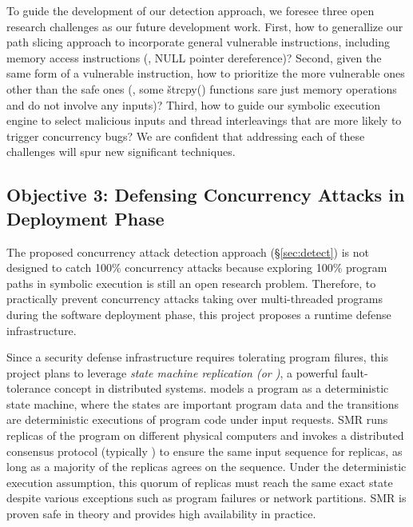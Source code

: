  To guide the development of our detection 
approach, we foresee three open research challenges as our future development 
work. First, how to generallize our path slicing approach to incorporate general 
vulnerable instructions, including memory access instructions (\eg, NULL pointer 
dereference)? Second, given the same form of a vulnerable instruction, how to 
prioritize the more vulnerable ones other than the safe ones (\eg, some 
\v{strcpy()} functions sare just memory operations and do not involve any 
inputs)? Third, how to guide our symbolic execution engine to select malicious 
inputs and thread interleavings that are more likely to trigger concurrency 
bugs? We are confident that addressing each of these challenges will spur new 
significant techniques.

\vspace{-.15in}\subsection{Objective 3: Defensing Concurrency Attacks 
in Deployment Phase}\label{sec:defense}\vspace{-.075in}

The proposed concurrency attack detection approach (\S\ref{sec:detect}) is not 
designed to catch 100\% concurrency attacks because exploring 100\% program 
paths in symbolic execution is still an open research problem. Therefore, to 
practically prevent concurrency attacks taking over multi-threaded programs 
during the software deployment phase, this project proposes a runtime defense 
infrastructure.

Since a security defense infrastructure requires tolerating program filures, 
this project plans to leverage \emph{state machine replication (or \smr)}, a 
powerful fault-tolerance concept in distributed systems. \smr 
models a program as a deterministic state machine, where the states are 
important program data and the transitions are deterministic executions of 
program code under input requests. SMR runs replicas of the program on 
different physical computers and invokes a distributed consensus protocol 
(typically \paxos) to ensure the same input sequence for replicas, 
as long as a majority of the replicas agrees on the sequence. 
Under the deterministic execution assumption, this quorum of replicas must reach 
the same exact state despite various exceptions such as program failures or 
network partitions. SMR is proven safe in theory and provides high availability 
in practice.



